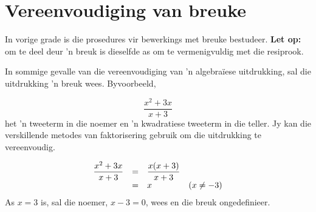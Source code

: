 \section{Vereenvoudiging van breuke}
\nopagebreak

In vorige grade is die prosedures vir bewerkings met breuke bestudeer.
\textbf{Let op:} om te deel deur 'n breuk is dieselfde as om te vermenigvuldig met die resiprook.\par

In sommige gevalle van die vereenvoudiging van ’n algebraïese uitdrukking, sal die uitdrukking ’n breuk wees. Byvoorbeeld,

\begin{equation*}
\dfrac{{x}^{2}+3x}{x+3}
\end{equation*}
het ’n tweeterm in die noemer en ’n kwadratiese tweeterm in die teller. Jy kan die verskillende metodes van faktorisering gebruik om die uitdrukking te vereenvoudig.\par 

\begin{equation*}
\begin{array}{llll} \dfrac{{x}^{2}+3x}{x+3}\hfill & =& \dfrac{x(x+3)}{x+3}\hfill & \\ & =& x\hfill & (x\neq -3)\hfill \end{array}
\end{equation*}
As $x = 3$ is, sal die noemer, $x-3 = 0$, wees en die breuk ongedefinieer.


